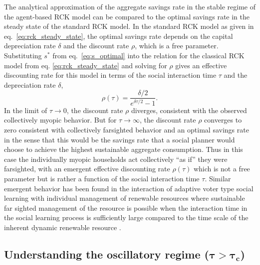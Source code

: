 The analytical approximation of the aggregate savings rate in the stable regime of the agent-based RCK model can be compared to the optimal savings rate in the steady state of the standard RCK model. In the standard RCK model as given in eq.~\eqref{eq:rck_steady_state}, the optimal savings rate depends on the capital depreciation rate $\delta$ and the discount rate $\rho$, which is a free parameter. Substituting $s^\ast$ from eq.~\eqref{eq:s_optimal} into the relation for the classical RCK model from eq. \eqref{eq:rck_steady_state} and solving for $\rho$ gives an effective discounting rate for this model in terms of the social interaction time $\tau$ and the depreciation rate $\delta$,
\begin{equation}
   \rho(\tau) = \frac{\delta/2}{e^{\delta \tau/2} - 1}. \label{eq:rhotau}
\end{equation}
In the limit of $\tau \to 0$, the discount rate $\rho$ diverges, consistent with the observed collectively myopic behavior. But for $\tau \to \infty$, the discount rate $\rho$ converges to zero consistent with collectively farsighted behavior and an optimal savings rate in the sense that this would be the savings rate that a social planner would choose to achieve the highest sustainable aggregate consumption. Thus in this case the individually myopic households act collectively ``as if'' they were farsighted, with an emergent effective discounting rate $\rho(\tau)$ which is not a free parameter but is rather a function of the social interaction time $\tau$. Similar emergent behavior has been found in the interaction of adaptive voter type social learning with individual management of renewable resources where sustainable far sighted management of the resource is possible when the interaction time in the social learning process is sufficiently large compared to the time scale of the inherent dynamic renewable resource \citep{Wiedermann2015}. 


\subsection{Understanding the oscillatory regime ($\mathbf{\tau \!>\! \tau_{c} }$)}
\label{sec:savings_oscillations}


